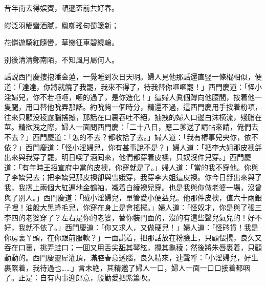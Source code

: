 昔年南去得娱賓，頓遜盃前共好春。

螘泛羽觴蠻酒膩，鳳啣瑤句蜀箋新；

花憐遊騎紅隨轡，草戀征車碧繞輪。

别後清清鄭南陌，不知風月屬何人。

話説西門慶摟抱潘金蓮，一覺睡到次日天明。婦人見他那話還直竪一條棍相似，便道：「達達，你將就饒了我罷，我來不得了，待我替你咂咂罷！」西門慶道：「怪小淫婦兒，你不若咂咂，咂的過了，是你造化！」這婦人眞個蹲向他腰間，按着他一隻腿，用口替他吮弄那話。約吮夠一個時分，精還不過，這西門慶用手按着粉項，往來只顧没稜露腦搖撼，那話在口裏吞吐不絕，抽拽的婦人口邊白沫横流，殘脂在莖。精欲洩之際，婦人一面問西門慶：「二十八日，應二爹送了請帖來請，俺們去不去？」西門慶道：「怎的不去？都收拾了去。」婦人道：「我有樁事兒央你，依不依？」西門慶道：「怪小淫婦兒，你有甚事說不是？」婦人道：「把李大姐那皮襖㧱出來與我穿了罷，明日喫了酒囘來，他們都穿着皮襖，只奴沒件兒穿。」西門慶道：「有年時王招宣府中當的皮襖，你穿就是了。」婦人道：「當的我不穿他。你與了李嬌兒去；把李嬌兒那皮襖卻與雪娥穿，我穿李大姐這皮襖。你今日㧱出來與了我，我㩟上兩個大紅遍地金鶴袖，襯着白綾襖兒穿。也是我與你做老婆一場，沒曾與了別人。」西門慶道：「賊小淫婦兒，單管愛小便益兒。他那件皮襖，值六十兩銀子哩！油般大黑蜂毛兒，你穿在身上是會搖擺。」婦人道：「怪奴才，你是與了張三李四的老婆穿了？左右是你的老婆，替你裝門面的，沒的有這些聲兒氣兒的！好不好，我就不依了。」西門慶道：「你又求人，又做硬兒！」婦人道：「怪硶貨！我是你房裏丫頭，在你跟前服軟？」一面説着，把那話放在粉臉上，只顧偎㨪，良久又吞在口裏，挑弄蛙口；一囬又用舌尖舐其琴絃，攪其龜稜；然後將朱唇裹着，只顧動動的。西門慶靈犀灌頂，滿腔春意透腦，良久精來，連聲呼：「小淫婦兒，好生裹緊着，我待過也……」言未絶，其精邈了婦人一口，婦人一面一口口接着都咽了。正是：自有内事迎郎意，殷勤愛把紫簫吹。

